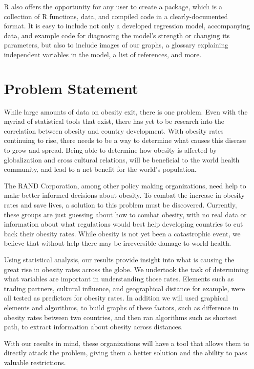 \documentclass[oneside,12pt]{report}
\begin{document}
R also offers the opportunity for any user to create a package, which is a collection of R functions, data, and compiled code in a clearly-documented format. It is easy to include not only a developed regression model, accompanying data, and example code for diagnosing the model's strength or changing its parameters, but also to include images of our graphs, a glossary explaining independent variables in the model, a list of references, and more.

\chapter{Problem Statement}

	While large amounts of data on obesity exit, there is one problem. Even with the myriad of statistical tools that exist, there has yet to be research into the correlation between obesity and country development. With obesity rates continuing to rise, there needs to be a way to determine what causes this disease to grow and spread. Being able to determine how obesity is affected by globalization and cross cultural relations, will be beneficial to the world health community, and lead to a net benefit for the world’s population.

The RAND Corporation, among other policy making organizations, need help to make better informed decisions about obesity. To combat the increase in obesity rates and save lives, a solution to this problem must be discovered. Currently, these groups are just guessing about how to combat obesity, with no real data or information about what regulations would best help developing countries to cut back their obesity rates. While obesity is not yet been a catastrophic event, we believe that without help there may be irreversible damage to world health.

Using statistical analysis, our results provide insight into what is causing the great rise in obesity rates across the globe. We undertook the task of determining what variables are important in understanding those rates. Elements such as trading partners, cultural influence, and geographical distance for example, were all tested as predictors for obesity rates. In addition we will used graphical elements and algorithms, to build graphs of these factors, such as difference in obesity rates between two countries, and then ran algorithms such as shortest path, to extract information about obesity across distances.

With our results in mind, these organizations will have a tool that allows them to directly attack the problem, giving them a better solution and the ability to pass valuable restrictions.
\end{document}
